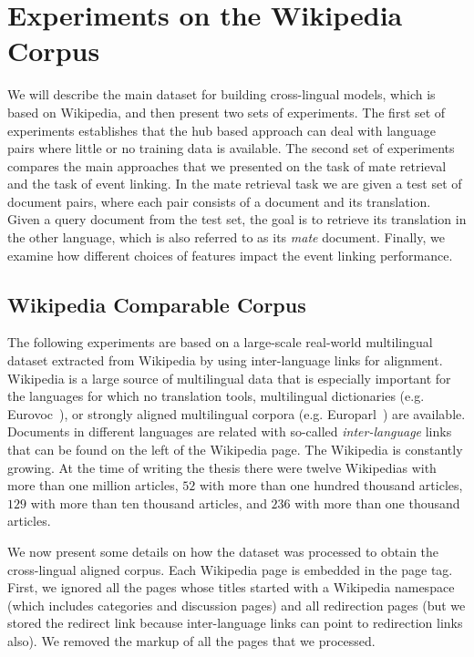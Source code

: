 \section{Experiments on the Wikipedia Corpus}\label{sec:evaluation}

We will describe the main dataset for building cross-lingual models, which is
based on Wikipedia, and then present two sets of experiments. The first set of experiments
establishes that the hub based approach can deal with language pairs where little
or no training data is available. The second set of experiments compares the main approaches
that we presented on the task of mate retrieval and the task of event linking. In the mate retrieval task we are given a test set of document pairs, where each pair consists of a document and its translation. Given a query document from the test set, the goal is to retrieve its translation in the other language, which is also referred to as its \emph{mate} document. Finally, we examine how different choices of features impact the event linking performance.

\subsection{Wikipedia Comparable Corpus}

The following experiments are based on a large-scale real-world multilingual dataset
extracted from Wikipedia by using inter-language links for alignment.
Wikipedia is a large source of multilingual data that is especially important for the languages for which no
translation tools, multilingual dictionaries (e.g. Eurovoc~\cite{eurovoc}), or strongly
aligned multilingual corpora (e.g. Europarl~\cite{europarl}) are available. Documents
in different languages are related with so-called \emph{inter-language} links that
can be found on the left of the Wikipedia page. The Wikipedia is constantly growing.
At the time of writing the thesis there were twelve Wikipedias with more than one million articles, $52$ with more
than one hundred thousand articles, $129$ with more than ten thousand articles, and $236$
with more than one thousand articles.

We now present some details on how the dataset was processed to obtain the cross-lingual aligned corpus.
Each Wikipedia page is embedded in the page tag. First, we ignored all the pages whose titles started with a Wikipedia namespace
(which includes categories and discussion pages) and all redirection pages (but we stored the redirect link because inter-language
links can point to redirection links also). We removed the markup of all the pages that we processed.

